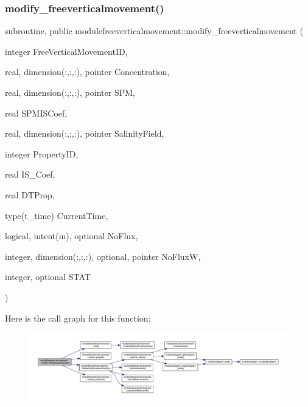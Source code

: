 \subsubsection{\texorpdfstring{modify\+\_\+freeverticalmovement()}{modify\_freeverticalmovement()}}
{\footnotesize\ttfamily subroutine, public modulefreeverticalmovement\+::modify\+\_\+freeverticalmovement (\begin{DoxyParamCaption}\item[{integer}]{Free\+Vertical\+Movement\+ID,  }\item[{real, dimension(\+:,\+:,\+:), pointer}]{Concentration,  }\item[{real, dimension(\+:,\+:,\+:), pointer}]{S\+PM,  }\item[{real}]{S\+P\+M\+I\+S\+Coef,  }\item[{real, dimension(\+:,\+:,\+:), pointer}]{Salinity\+Field,  }\item[{integer}]{Property\+ID,  }\item[{real}]{I\+S\+\_\+\+Coef,  }\item[{real}]{D\+T\+Prop,  }\item[{type(t\+\_\+time)}]{Current\+Time,  }\item[{logical, intent(in), optional}]{No\+Flux,  }\item[{integer, dimension(\+:,\+:,\+:), optional, pointer}]{No\+FluxW,  }\item[{integer, optional}]{S\+T\+AT }\end{DoxyParamCaption})}

Here is the call graph for this function\+:\nopagebreak
\begin{figure}[H]
\begin{center}
\leavevmode
\includegraphics[width=350pt]{namespacemodulefreeverticalmovement_a70493770ba7c42e3f3d4dc5f09ae0e45_cgraph}
\end{center}
\end{figure}
\mbox{\label{namespacemodulefreeverticalmovement_a074424b5e6d0b4d4588c869805dbf784}} 
